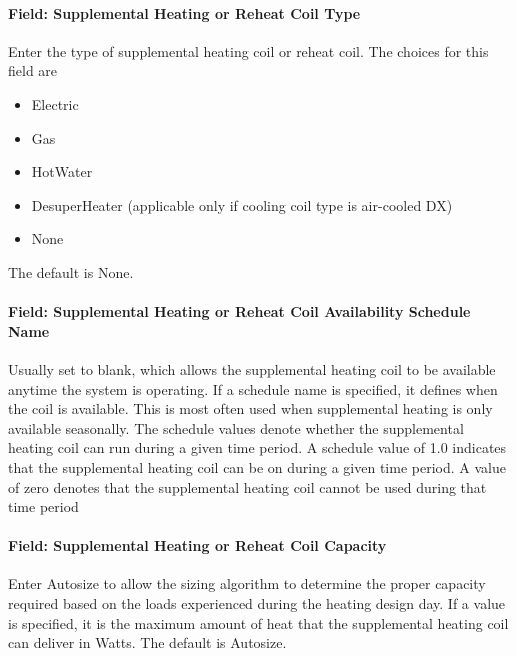 \paragraph{Field: Supplemental Heating or Reheat Coil Type}\label{field-supplemental-heating-or-reheat-coil-type}

Enter the type of supplemental heating coil or reheat coil. The choices for this field are

\begin{itemize}
\item
  Electric
\item
  Gas
\item
  HotWater
\item
  DesuperHeater (applicable only if cooling coil type is air-cooled DX)
\item
  None
\end{itemize}

The default is None.

\paragraph{Field: Supplemental Heating or Reheat Coil Availability Schedule Name}\label{field-supplemental-heating-or-reheat-coil-availability-schedule-name}

Usually set to blank, which allows the supplemental heating coil to be available anytime the system is operating. If a schedule name is specified, it defines when the coil is available. This is most often used when supplemental heating is only available seasonally. The schedule values denote whether the supplemental heating coil can run during a given time period. A schedule value of 1.0 indicates that the supplemental heating coil can be on during a given time period. A value of zero denotes that the supplemental heating coil cannot be used during that time period

\paragraph{Field: Supplemental Heating or Reheat Coil Capacity}\label{field-supplemental-heating-or-reheat-coil-capacity}

Enter Autosize to allow the sizing algorithm to determine the proper capacity required based on the loads experienced during the heating design day. If a value is specified, it is the maximum amount of heat that the supplemental heating coil can deliver in Watts. The default is Autosize.

